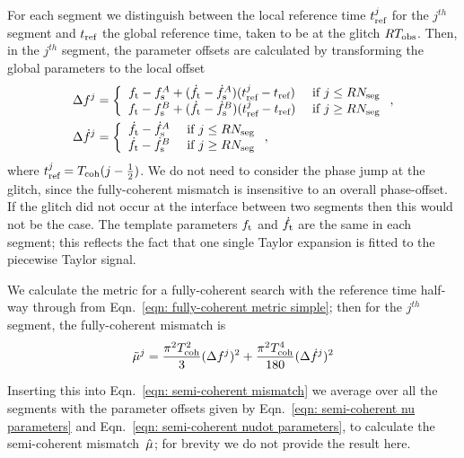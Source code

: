 \documentclass[../full_thesis/full_thesis.tex]{subfiles}
\begin{document}
For each segment we distinguish between the local reference time $t_{\textrm{ref}}^j$ for
the $j^{th}$ segment and $t_{\textrm{ref}}$ the global reference time, taken to be at the
glitch $RT_{\mathrm{obs}}$. Then, in the $j^{th}$ segment, the parameter offsets are calculated
by transforming the global parameters to the local offset
\begin{align}
\Delta f^j & = \left\{
\begin{array}{cc}
{f_{\textrm{t}}} - f_{\textrm{s}}^A + (\dot{f}_{\textrm{t}} - \dot{f}_{\textrm{s}}^A)(t_{\textrm{ref}}^{j} - t_{\textrm{ref}})& \textrm{ if } j \le RN_{\textrm{seg}} \\
{f_{\textrm{t}}} - f_{\textrm{s}}^B + (\dot{f}_{\textrm{t}} - \dot{f}_{\textrm{s}}^B)(t_{\textrm{ref}}^{j} - t_{\textrm{ref}})& \textrm{ if } j \ge RN_{\textrm{seg}}
\end{array}\right.,
\label{eqn: semi-coherent nu parameters}
\\
\Delta\dot{f}^j &= \left\{
\begin{array}{cc}
\dot{f}_{\textrm{t}} - \dot{f}_{\textrm{s}}^A & \textrm{ if } j \le RN_{\textrm{seg}} \\
\dot{f}_{\textrm{t}} - \dot{f}_{\textrm{s}}^B & \textrm{ if } j \ge RN_{\textrm{seg}}
\end{array}\right.,
\label{eqn: semi-coherent nudot parameters}
\end{align}
where $t_{\textrm{ref}}^{j} = T_{\mathrm{coh}}(j - \frac{1}{2})$. We do not need to consider the
phase jump at the glitch, since the fully-coherent mismatch is insensitive
to an overall phase-offset. If the glitch did not occur
at the interface between two segments then this would not be the case.  The
template parameters ${f_{\textrm{t}}}$ and $\dot{f}_{\textrm{t}}$ are the same in each segment; this
reflects the fact that one single Taylor expansion is fitted to the piecewise
Taylor signal.

We calculate the metric for a fully-coherent search with the reference time
half-way through from Eqn.~\eqref{eqn: fully-coherent metric simple}; then for
the $j^{th}$ segment, the fully-coherent mismatch is
\begin{align}
\tilde{\mu}^j = \frac{\pi^{2}T_{\mathrm{coh}}^{2}}{3} (\Delta f^{j})^{2}
+ \frac{\pi^{2}T_{\mathrm{coh}}^{4}}{180}(\Delta\dot{f}^j)^{2}
\end{align}

Inserting this into Eqn.~\eqref{eqn: semi-coherent mismatch} we average over all
the segments with the parameter offsets given by Eqn.~\eqref{eqn: semi-coherent
nu parameters} and Eqn.~\eqref{eqn: semi-coherent nudot parameters}, to calculate
the semi-coherent mismatch~$\hat{\mu}$; for brevity we do not provide the result here.
\end{document}
